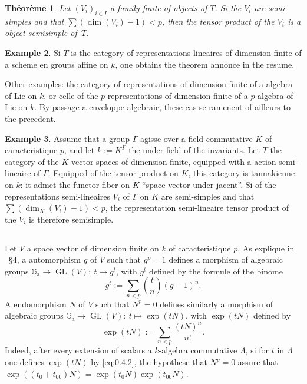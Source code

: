 \documentclass[11pt,a4paper]{article}
\theoremstyle{plain}
\newtheorem{theorem}{Th\'eor\`eme}[section]
\theoremstyle{definition}
\newtheorem{example}[theorem]{Example}
\DeclareMathOperator{\GL}{GL}
\newcommand{\Ga}{\mathbb{G}_\mathrm{a}}
\begin{document}
\begin{theorem}\label{thm:0.1}
Let $(V_i)_{i \in I}$ a family finite of objects of $T$. Si the $V_i$ are semi-simples and that $\sum (\dim(V_i) - 1) < p$, then the tensor product of the $V_i$ is a object semisimple of~$T$.
\end{theorem}

\begin{example}\label{ex:0.2}
Si $T$ is the category of representations lineaires of dimension finite of a scheme en groups affine on $k$, one obtains the theorem annonce in the resume.

Other examples: the category of representations of dimension finite of a algebra of Lie on $k$, or celle of the $p$-representations of dimension finite of a $p$-algebra of Lie on $k$. By passage a enveloppe algebraic, these cas se ramenent of ailleurs to the precedent.
\end{example}

\begin{example}\label{ex:0.3}
Assume that a group $\Gamma$ agisse over a field commutative $K$ of caracteristique $p$, and let $k := K^\Gamma$ the under-field of the invariants. Let $T$ the category of the $K$-vector spaces of dimension finite, equipped with a action semi-lineaire of $\Gamma$. Equipped of the tensor product on $K$, this category is tannakienne on $k$: it admet the functor fiber on $K$ ``space vector under-jacent''. Si of the representations semi-lineaires $V_i$ of $\Gamma$ on $K$ are semi-simples and that $\sum (\dim_K(V_i) - 1) < p$, the representation semi-lineaire tensor product of the $V_i$ is therefore semisimple.
\end{example}

\subsection{}
Let $V$ a space vector of dimension finite on $k$ of caracteristique $p$. As explique in \cite{Serre1994}~\S4, a automorphism $g$ of $V$ such that $g^p = 1$ defines a morphism of algebraic groups $\Ga \to \GL(V):\ t \mapsto g^t$, with $g^t$ defined by the formule of the binome
\begin{equation}\label{eq:0.4.1}
g^t := \sum_{n < p} \binom{t}{n} (g - 1)^n.
\end{equation}
A endomorphism $N$ of $V$ such that $N^p = 0$ defines similarly a morphism of algebraic groups $\Ga \to \GL(V):\ t \mapsto \exp(tN)$, with $\exp(tN)$ defined by
\begin{equation}\label{eq:0.4.2}
\exp(tN) := \sum_{n < p} \frac{(tN)^n}{n!}.
\end{equation}
Indeed, after every extension of scalars a $k$-algebra commutative $\Lambda$, si for $t$ in $\Lambda$ one defines $\exp(tN)$ by \eqref{eq:0.4.2}, the hypothese that $N^p = 0$ assure that $\exp((t_0 + t_{00})N) = \exp(t_0 N) \exp(t_{00} N)$.
\end{document}
